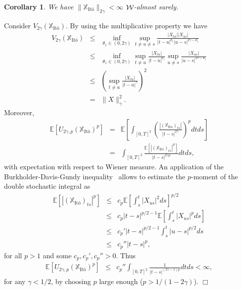 \documentclass[a4paper,11pt]{article}
\newtheorem{corollary}[theorem]{Corollary}
\newenvironment{proof}[1][Proof]{{\sc #1.} }{\hfill $\Box$}
\newcommand{\expect}{\mathbb{E}}
\newcommand{\W}{\mathop{\mathrm{{\cal W}}}\nolimits}
\begin{document}
\begin{corollary}
We have $\|\mathbb{X}_{{\text{It\^o}}}\|_{2\gamma} < \infty$ $\W$-almost 
surely.  
\end{corollary}
\begin{proof}
Consider $V_{2\gamma}(\mathbb{X}_{\text{It\^o}})$. By using the 
multiplicative property we have
\begin{eqnarray*}
V_{2\gamma}(\mathbb{X}_{\text{It\^o}}) 
&\le&  
\inf_{\theta_1 \in (0,2\gamma)} \sup_{t \neq u \neq s} 
\frac{|X_{tu}||X_{us}|}{|t-u|^{\theta_1}|u-s|^{2\gamma-\theta_1}}\\ 
&\le&  
\inf_{\theta_1 \in(0,2\gamma)} \sup_{t \neq u} \frac{|X_{tu}|}
{|t-u|^{\theta_1}}\sup_{u \neq s}
\frac{|X_{us}|}{|u-s|^{2\gamma-\theta_1}}\\
&\le&  
\left(\sup_{t \neq u} \frac{|X_{tu}|}{|t-u|^{\gamma}}\right)^2\\
& = &
\|X\|_\gamma^2.
\end{eqnarray*}
Moreover,
\begin{eqnarray*}
\expect [U_{2\gamma,p}(\mathbb{X}_{\text{It\^o}})^p] 
&=& 
\expect  \left[\int_{[0,T]^2}\left(\frac{|(\mathbb{X}_{\text{It\^o}})_{t s}|}
{|t-s|^{2\gamma}}\right)^p dt ds \right]\\
&=&    
\int_{[0,T]^2}\frac{ \expect [|(\mathbb{X}_{\text{It\^o}})_{t s}|^p]}
{|t-s|^{2\gamma p}} dt ds, 
\end{eqnarray*}
with expectation with respect to Wiener measure. An application of the 
Burkholder-Davis-Gundy inequality~\cite{Yor} allows to estimate the 
$p$-moment of the double stochastic integral as
\begin{eqnarray*}
\expect [|(\mathbb{X}_{\text{It\^o}})_{t s}|^p] 
& \le&
c_p \expect \left[\int_s^t |X_{us}|^2 ds\right]^{p/2} \\
&\le&
c_p |t-s|^{p/2-1} \expect \left[\int_s^t |X_{us}|^p ds\right] \\ 
& \le &
c_p' |t-s|^{p/2-1}\int_s^t |u-s|^{p/2} ds \\
&\le &
c_p'' |t-s|^{p},   
\end{eqnarray*}
for all $p > 1$ and some $c_p, c_p', c_p'' > 0$. Thus
\begin{eqnarray*}
\expect [U_{2\gamma,p}(\mathbb{X}_{\text{It\^o}})^p] 
&\le& 
c_p'' \int_{[0,T]^2} \frac{ 1}{|t-s|^{(2\gamma-1) p}} dt ds < \infty,
\end{eqnarray*}
for any $\gamma < 1/2$, by choosing $p$ large enough ($p > 1/(1-2\gamma)$).
\end{proof}
 
\end{document}
